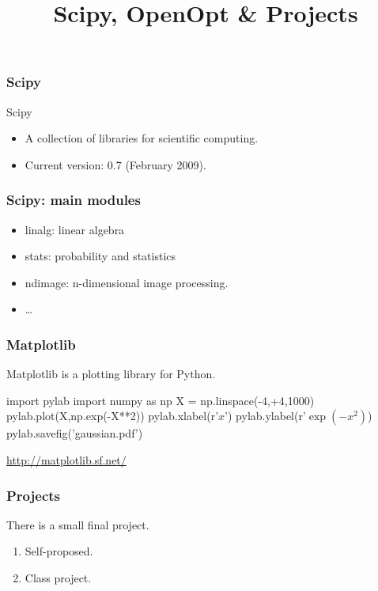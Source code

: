 
\title{Scipy, OpenOpt \& Projects}

\frame{\maketitle}

\begin{frame}[fragile]
\frametitle{Scipy}

\begin{block}{Scipy}
\begin{itemize}
\item A collection of libraries for scientific computing.
\item Current version: 0.7 (February 2009).
\end{itemize}
\end{block}

\end{frame}

\begin{frame}[fragile]
\frametitle{Scipy: main modules}

\begin{itemize}
\item linalg: linear algebra
\item stats: probability and statistics
\item ndimage: n-dimensional image processing.
\item \ldots
\end{itemize}
\end{frame}

\begin{frame}[fragile]
\frametitle{Matplotlib}
Matplotlib is a \alert{plotting library} for Python.

\begin{python}
import pylab
import numpy as np
X = np.linspace(-4,+4,1000)
pylab.plot(X,np.exp(-X**2))
pylab.xlabel(r'$x$')
pylab.ylabel(r'$\exp(-x^{2})$)
pylab.savefig('gaussian.pdf')
\end{python}

\centering
\href{http://matplotlib.sf.net/}{http://matplotlib.sf.net/}

\end{frame}

\begin{frame}[fragile]
\frametitle{Projects}

There is a small final project.

\begin{enumerate}
\item Self-proposed.
\item Class project.
\end{enumerate}
\end{frame}

